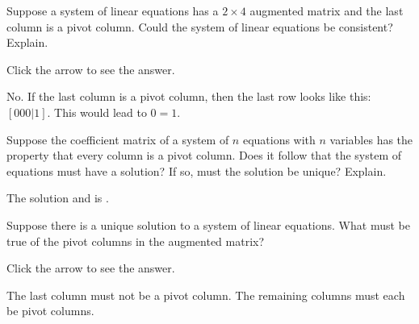 \documentclass{ximera}
\begin{document}
\begin{problem}\label{prb:2.40} Suppose a system of linear equations has a $2\times 4$ augmented
matrix and the last column is a pivot column. Could the system of linear
equations be consistent? Explain.

Click the arrow to see the answer. 
\begin{expandable}
 No. If the last column is a pivot column, then the last row looks like this: $[0 0 0 | 1]$.  This would lead to $0=1.$
\end{expandable}
\end{problem}

\begin{problem}\label{prb:2.41} Suppose the coefficient matrix of a system of $n$ equations with $n$
variables has the property that every column is a pivot column. Does it
follow that the system of equations must have a solution? If so, must the
solution be unique? Explain.

The solution  and is .
\end{problem}

\begin{problem}\label{prb:2.42} Suppose there is a unique solution to a system of linear equations.
What must be true of the pivot columns in the augmented matrix?

Click the arrow to see the answer. 
\begin{expandable}
The last column must not be a pivot column. The remaining columns must each be pivot
columns.
\end{expandable}
\end{problem}
\end{document}

